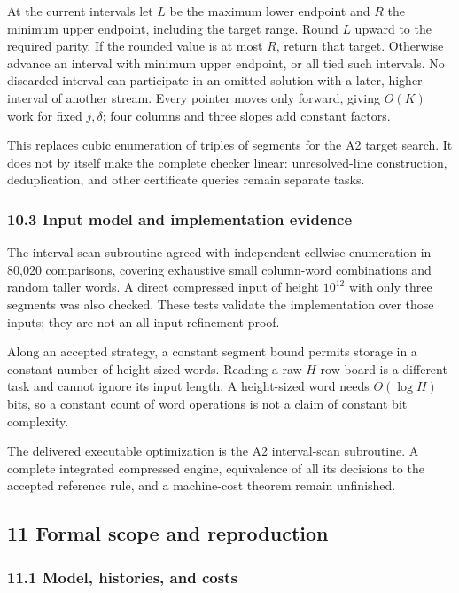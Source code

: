 \documentclass[
  a4paper,
]{article}
\begin{document}
At the current intervals let \(L\) be the maximum lower endpoint and
\(R\) the minimum upper endpoint, including the target range. Round
\(L\) upward to the required parity. If the rounded value is at most
\(R\), return that target. Otherwise advance an interval with minimum
upper endpoint, or all tied such intervals. No discarded interval can
participate in an omitted solution with a later, higher interval of
another stream. Every pointer moves only forward, giving \(O(K)\) work
for fixed \(j,\delta\); four columns and three slopes add constant
factors.

This replaces cubic enumeration of triples of segments for the A2 target
search. It does not by itself make the complete checker linear:
unresolved-line construction, deduplication, and other certificate
queries remain separate tasks.

\subsubsection{10.3 Input model and implementation
evidence}\label{input-model-and-implementation-evidence}

The interval-scan subroutine agreed with independent cellwise
enumeration in 80,020 comparisons, covering exhaustive small column-word
combinations and random taller words. A direct compressed input of
height \(10^{12}\) with only three segments was also checked. These
tests validate the implementation over those inputs; they are not an
all-input refinement proof.

Along an accepted strategy, a constant segment bound permits storage in
a constant number of height-sized words. Reading a raw \(H\)-row board
is a different task and cannot ignore its input length. A height-sized
word needs \(\Theta(\log H)\) bits, so a constant count of word
operations is not a claim of constant bit complexity.

The delivered executable optimization is the A2 interval-scan
subroutine. A complete integrated compressed engine, equivalence of all
its decisions to the accepted reference rule, and a machine-cost theorem
remain unfinished.

\subsection{11 Formal scope and
reproduction}\label{formal-scope-and-reproduction}

\subsubsection{11.1 Model, histories, and
costs}\label{model-histories-and-costs}
\end{document}
